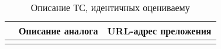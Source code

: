 \begin{longtable}{|p{5mm}|p{85mm}|M{63mm}|}
	\caption[]{\footnotesize {Описание ТС, идентичных оцениваему}} \label{tab:5}\\ 
	\hline
\bf	{} &\bf  Описание аналога & \bf URL-адрес преложения  \\ \hline \endhead
		\toprule \centering


					


%












\end{longtable}
